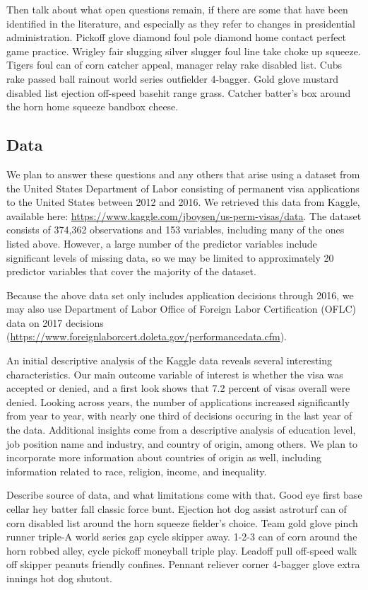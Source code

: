 \documentclass[]{article}
\begin{document}
Then talk about what open questions remain, if there are some that have
been identified in the literature, and especially as they refer to
changes in presidential administration. Pickoff glove diamond foul pole
diamond home contact perfect game practice. Wrigley fair slugging silver
slugger foul line take choke up squeeze. Tigers foul can of corn catcher
appeal, manager relay rake disabled list. Cubs rake passed ball rainout
world series outfielder 4-bagger. Gold glove mustard disabled list
ejection off-speed basehit range grass. Catcher batter's box around the
horn home squeeze bandbox cheese.

\subsection{Data}\label{data}

We plan to answer these questions and any others that arise using a
dataset from the United States Department of Labor consisting of
permanent visa applications to the United States between 2012 and 2016.
We retrieved this data from Kaggle, available here:
\url{https://www.kaggle.com/jboysen/us-perm-visas/data}. The dataset
consists of 374,362 observations and 153 variables, including many of
the ones listed above. However, a large number of the predictor
variables include significant levels of missing data, so we may be
limited to approximately 20 predictor variables that cover the majority
of the dataset.

Because the above data set only includes application decisions through
2016, we may also use Department of Labor Office of Foreign Labor
Certification (OFLC) data on 2017 decisions
(\url{https://www.foreignlaborcert.doleta.gov/performancedata.cfm}).

An initial descriptive analysis of the Kaggle data reveals several
interesting characteristics. Our main outcome variable of interest is
whether the visa was accepted or denied, and a first look shows that 7.2
percent of visas overall were denied. Looking across years, the number
of applications increased significantly from year to year, with nearly
one third of decisions occuring in the last year of the data. Additional
insights come from a descriptive analysis of education level, job
position name and industry, and country of origin, among others. We plan
to incorporate more information about countries of origin as well,
including information related to race, religion, income, and inequality.

Describe source of data, and what limitations come with that. Good eye
first base cellar hey batter fall classic force bunt. Ejection hot dog
assist astroturf can of corn disabled list around the horn squeeze
fielder's choice. Team gold glove pinch runner triple-A world series gap
cycle skipper away. 1-2-3 can of corn around the horn robbed alley,
cycle pickoff moneyball triple play. Leadoff pull off-speed walk off
skipper peanuts friendly confines. Pennant reliever corner 4-bagger
glove extra innings hot dog shutout.
\end{document}
